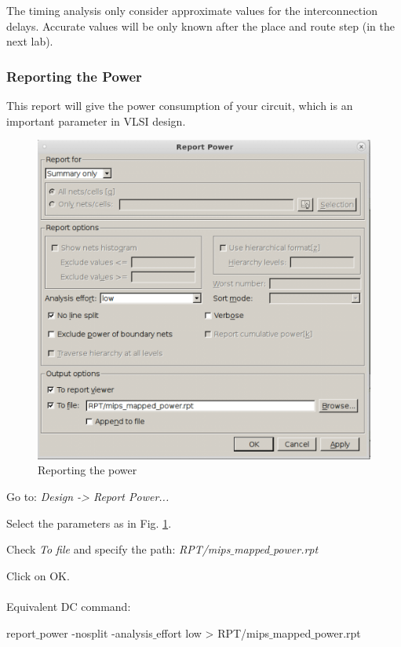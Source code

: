 \begin{remark}
The timing analysis only consider approximate values for the interconnection delays. Accurate values will be only known after the place and route step (in the next lab). 
\end{remark}

\subsubsection{Reporting the Power}
This report will give the power consumption of your circuit, which is an important parameter in VLSI design.

 \begin{enumerate}
	\parbox[t]{\dimexpr\textwidth-\leftmargin}{%
		\begin{figure}
			\vspace{0mm}
			\centering
			\vspace{-\baselineskip}
	\includegraphics[scale=0.3]{figures/lab3_design_compiler/reportpower}
\caption{Reporting the power}
\label{fig_reportpower}
		\end{figure}
	\item Go to: \textit {Design -> Report Power...}
\item Select the parameters as in Fig. \ref{fig_reportpower}.
\item Check \textit{To file} and specify the path: \textit{RPT/mips$\_$mapped$\_$power.rpt}
\item Click on OK. \\ \\
Equivalent DC command:

\begin{codeline}
	report$\_$power -nosplit -analysis$\_$effort low > RPT/mips$\_$mapped$\_$power.rpt
\end{codeline}

	}
\end{enumerate}

